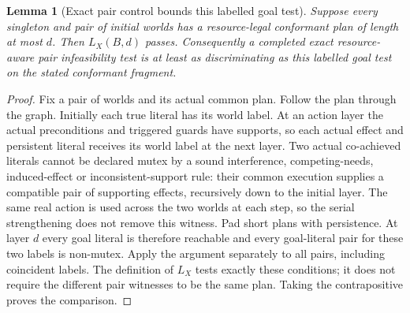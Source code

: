 \documentclass[11pt]{article}
\newtheorem{lemma}[theorem]{Lemma}
\theoremstyle{definition}
\begin{document}
\begin{lemma}[Exact pair control bounds this labelled goal test]\label{lem:lugpair}
Suppose every singleton and pair of initial worlds has a resource-legal
conformant plan of length at most $d$. Then $L_X(B,d)$ passes. Consequently a
completed exact resource-aware pair infeasibility test is at least as
discriminating as this labelled goal test on the stated conformant fragment.
\end{lemma}
\begin{proof}
Fix a pair of worlds and its actual common plan. Follow the plan through the
graph. Initially each true literal has its world label. At an action layer the
actual preconditions and triggered guards have supports, so each actual effect
and persistent literal receives its world label at the next layer. Two actual
co-achieved literals cannot be declared mutex by a sound interference,
competing-needs, induced-effect or inconsistent-support rule: their common
execution supplies a compatible pair of supporting effects, recursively down
to the initial layer. The same real action is used across the two worlds at
each step, so the serial strengthening does not remove this witness. Pad short
plans with persistence. At layer $d$ every goal literal is therefore reachable
and every goal-literal pair for these two labels is non-mutex. Apply the argument
separately to all pairs, including coincident labels. The definition of $L_X$
tests exactly these conditions; it does not require the different pair
witnesses to be the same plan. Taking the contrapositive proves the comparison.
\end{proof}
\end{document}
